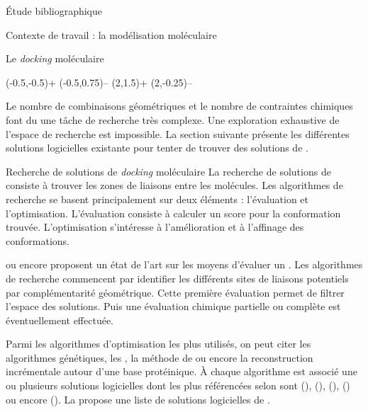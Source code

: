 \documentclass[myfrancais,ngerman,english,french]{mythesis}
\begin{document}
\begin{mychapter}{Étude bibliographique}
\begin{mysection}{Contexte de travail : la modélisation moléculaire}
\begin{mysubsection}{Le \textit{docking} moléculaire}
\begin{myfigure}
\begin{mysubfigure}
\begin{myps}
							\mysign(-0.5,-0.5){+}
							\mysign(-0.5,0.75){--}
							\mysign(2,1.5){+}
							\mysign(2,-0.25){--}
						\end{myps}
					\end{mysubfigure}
				\end{myfigure}

				Le nombre de combinaisons géométriques et le nombre de contraintes chimiques font du  une tâche de recherche très complexe.
				Une exploration exhaustive de l'espace de recherche est impossible.
				La section suivante présente les différentes solutions logicielles existante pour tenter de trouver des solutions de .
			\end{mysubsection}
			\begin{mysubsection}{Recherche de solutions de \textit{docking} moléculaire}
				La recherche de solutions de  consiste à trouver les zones de liaisons entre les molécules.
				Les algorithmes de recherche se basent principalement sur deux éléments : l'évaluation et l'optimisation.
				L'évaluation consiste à calculer un score pour la conformation trouvée.
				L'optimisation s'intéresse à l'amélioration et à l'affinage des conformations.

				 ou encore  proposent un état de l'art sur les moyens d'évaluer un .
				Les algorithmes de recherche commencent par identifier les différents sites de liaisons potentiels par complémentarité géométrique.
				Cette première évaluation permet de filtrer l'espace des solutions.
				Puis une évaluation chimique partielle ou complète est éventuellement effectuée.

				Parmi les algorithmes d'optimisation les plus utilisés, on peut citer les algorithmes génétiques, les , la méthode de  ou encore la reconstruction incrémentale autour d'une base protéinique.
				À chaque algorithme est associé une ou plusieurs solutions logicielles dont les plus référencées selon  sont \myAutoDock (), \myGOLD (), \myFlexX (), \myDOCK () ou encore \myICMDocking ().
				La  propose une liste de solutions logicielles de .


\end{mysubsection}
\end{mysection}
\end{mychapter}
\end{document}
